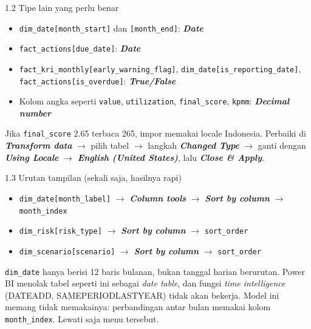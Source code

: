 \documentclass[11pt,a4paper]{article}
\newcommand{\file}[1]{\texttt{\small #1}}
\newcommand{\ui}[1]{\textbf{\textit{#1}}}
\begin{document}
\begin{stepbox}{1.2 Tipe lain yang perlu benar}
\begin{itemize}
\item \file{dim\_date[month\_start]} dan \file{[month\_end]}: \ui{Date}
\item \file{fact\_actions[due\_date]}: \ui{Date}
\item \file{fact\_kri\_monthly[early\_warning\_flag]}, \file{dim\_date[is\_reporting\_date]}, \file{fact\_actions[is\_overdue]}: \ui{True/False}
\item Kolom angka seperti \file{value}, \file{utilization}, \file{final\_score}, \file{kpmm}: \ui{Decimal number}
\end{itemize}
\end{stepbox}

\begin{warnbox}
Jika \file{final\_score} 2.65 terbaca 265, impor memakai locale Indonesia. Perbaiki di \ui{Transform data} $\rightarrow$ pilih tabel $\rightarrow$ langkah \ui{Changed Type} $\rightarrow$ ganti dengan \ui{Using Locale} $\rightarrow$ \ui{English (United States)}, lalu \ui{Close \& Apply}.
\end{warnbox}

\begin{stepbox}{1.3 Urutan tampilan (sekali saja, hasilnya rapi)}
\begin{itemize}
\item \file{dim\_date[month\_label]} $\rightarrow$ \ui{Column tools} $\rightarrow$ \ui{Sort by column} $\rightarrow$ \file{month\_index}
\item \file{dim\_risk[risk\_type]} $\rightarrow$ \ui{Sort by column} $\rightarrow$ \file{sort\_order}
\item \file{dim\_scenario[scenario]} $\rightarrow$ \ui{Sort by column} $\rightarrow$ \file{sort\_order}
\end{itemize}
\end{stepbox}

\begin{warnbox}
\file{dim\_date} hanya berisi 12 baris bulanan, bukan tanggal harian berurutan. Power BI menolak tabel seperti ini sebagai \emph{date table}, dan fungsi \emph{time intelligence} (DATEADD, SAMEPERIODLASTYEAR) tidak akan bekerja. Model ini memang tidak memakainya: perbandingan antar bulan memakai kolom \file{month\_index}. Lewati saja menu tersebut.
\end{warnbox}
\end{document}
